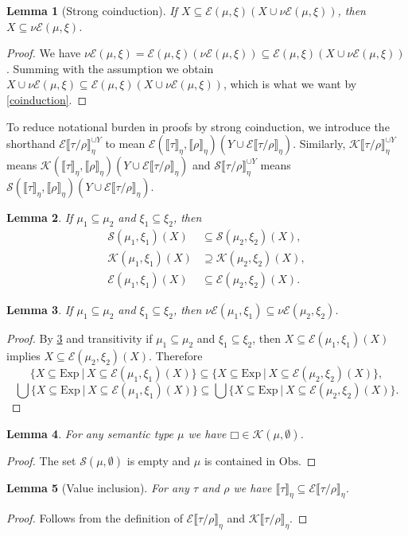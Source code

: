 \documentclass[a4paper, 12pt]{report}
\newcommand{\E}{\mathcal{E}}
\newcommand{\K}{\mathcal{K}}
\renewcommand{\S}{\mathcal{S}}
\newcommand{\Obs}{\mathrm{Obs}}
\newcommand{\+}{\enspace}
\newtheorem{lemma}{Lemma}
\begin{document}
\begin{lemma}[Strong coinduction]\label{strong-coinduction}
	If $X ⊆ \E(μ,ξ)(X∪ν\E(μ,ξ))$, then $X ⊆ ν\E(μ,ξ)$.
\end{lemma}
\begin{proof}
	We have $ν\E(μ,ξ) = \E(μ,ξ)(ν\E(μ,ξ)) ⊆ \E(μ,ξ)(X∪ν\E(μ,ξ))$.
	Summing with the assumption we obtain
	$X∪ν\E(μ,ξ) ⊆ \E(μ,ξ)(X∪ν\E(μ,ξ))$, which is what we want by \cref{coinduction}.
\end{proof}
To reduce notational burden in proofs by strong coinduction,
we introduce the shorthand
$\E⟦τ/ρ⟧_η^{∪Y}$ to mean $\E(⟦τ⟧_η,⟦ρ⟧_η)(Y∪\E⟦τ/ρ⟧_η)$.
Similarly,
$\K⟦τ/ρ⟧_η^{∪Y}$ means $\K(⟦τ⟧_η,⟦ρ⟧_η)(Y∪\E⟦τ/ρ⟧_η)$ and
$\S⟦τ/ρ⟧_η^{∪Y}$ means $\S(⟦τ⟧_η,⟦ρ⟧_η)(Y∪\E⟦τ/ρ⟧_η)$.

\begin{lemma}
If $μ_1 ⊆ μ_2$ and $ξ_1 ⊆ ξ_2$,
then
\begin{align*}
\S(μ_1,ξ_1)(X) &⊆ \S(μ_2,ξ_2)(X), \\
\K(μ_1,ξ_1)(X) &⊇ \K(μ_2,ξ_2)(X), \\
\E(μ_1,ξ_1)(X) &⊆ \E(μ_2,ξ_2)(X).
\end{align*}
\end{lemma}

\begin{lemma}\label{monotonicity}
If $μ_1 ⊆ μ_2$ and $ξ_1 ⊆ ξ_2$, then $ν\E(μ_1,ξ_1) ⊆ ν\E(μ_2,ξ_2)$.
\end{lemma}
\begin{proof}
By \cref{monotonicity} and transitivity
if $μ_1 ⊆ μ_2$ and $ξ_1 ⊆ ξ_2$, then
$X ⊆ \E(μ_1,ξ_1)(X)$ implies $X ⊆ \E(μ_2,ξ_2)(X)$.
Therefore
$$\{X ⊆ \mathrm{Exp} │ X ⊆ \E(μ_1,ξ_1)(X)\}
⊆\{X ⊆ \mathrm{Exp} │ X ⊆ \E(μ_2,ξ_2)(X)\},$$
$$\bigcup \{X ⊆ \mathrm{Exp} │ X ⊆ \E(μ_1,ξ_1)(X)\}
⊆\bigcup \{X ⊆ \mathrm{Exp} │ X ⊆ \E(μ_2,ξ_2)(X)\}.$$
\end{proof}

\begin{lemma}\label{empty-context}
	For any semantic type $μ$ we have $□ ∈ \K(μ,∅)$.
\end{lemma}
\begin{proof}
	The set $\S(μ,∅)$ is empty and $μ$ is contained in $\Obs$.
\end{proof}

\begin{lemma}[Value inclusion]\label{value-inclusion}
	For any $τ$ and $ρ$ we have $⟦τ⟧_η ⊆ \E⟦τ/ρ⟧_η$.
\end{lemma}
\begin{proof}
	Follows from the definition of $\E⟦τ/ρ⟧_η$ and $\K⟦τ/ρ⟧_η$.
\end{proof}
\end{document}
